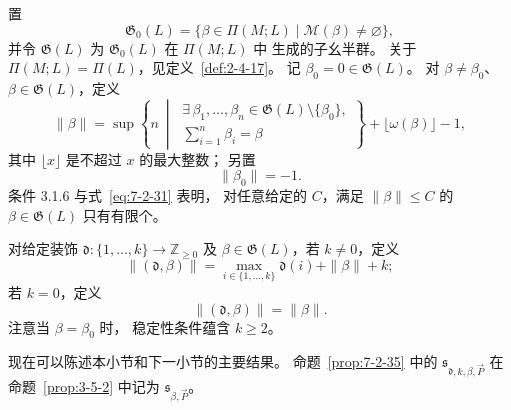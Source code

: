 置
\begin{equation}
\mathfrak G_0(L)=\{\beta\in\Pi(M;L)\mid
\mathcal M(\beta)\ne\varnothing\},
\tag{7.2.30}\label{eq:7-2-30}
\end{equation}
并令 $\mathfrak G(L)$ 为 $\mathfrak G_0(L)$ 在 $\Pi(M;L)$ 中
生成的子幺半群。
关于 $\Pi(M;L)=\Pi(L)$，见定义~\ref{def:2-4-17}。
记 $\beta_0=0\in\mathfrak G(L)$。
对 $\beta\ne\beta_0$、$\beta\in\mathfrak G(L)$，定义
\begin{equation}
\|\beta\|=
\sup\left\{n\ \middle|\
\begin{gathered}
\exists\,\beta_1,\ldots,\beta_n
\in\mathfrak G(L)\setminus\{\beta_0\},\\[-2pt]
\displaystyle\sum_{i=1}^{n}\beta_i=\beta
\end{gathered}\right\}
+\lfloor\omega(\beta)\rfloor-1,
\tag{7.2.31}\label{eq:7-2-31}
\end{equation}
其中 $\lfloor x\rfloor$ 是不超过 $x$ 的最大整数；
另置
\begin{equation}
\|\beta_0\|=-1.
\tag{7.2.32}\label{eq:7-2-32}
\end{equation}
条件 3.1.6 与式~\eqref{eq:7-2-31} 表明，
对任意给定的 $C$，满足 $\|\beta\|\le C$
的 $\beta\in\mathfrak G(L)$ 只有有限个。

对给定装饰
$\mathfrak d\colon\{1,\ldots,k\}\to\mathbb Z_{\ge0}$
及 $\beta\in\mathfrak G(L)$，若 $k\ne0$，定义
\begin{equation}
\|(\mathfrak d,\beta)\|
=\max_{i\in\{1,\ldots,k\}}\mathfrak d(i)
+\|\beta\|+k;
\tag{7.2.33}\label{eq:7-2-33}
\end{equation}
若 $k=0$，定义
\begin{equation}
\|(\mathfrak d,\beta)\|=\|\beta\|.
\tag{7.2.34}\label{eq:7-2-34}
\end{equation}
注意当 $\beta=\beta_0$ 时，
稳定性条件蕴含 $k\ge2$。

现在可以陈述本小节和下一小节的主要结果。
命题~\ref{prop:7-2-35} 中的
$\mathfrak s_{\mathfrak d,k,\beta,\vec P}$
在命题~\ref{prop:3-5-2} 中记为
$\mathfrak s_{\beta,\vec P}$。

